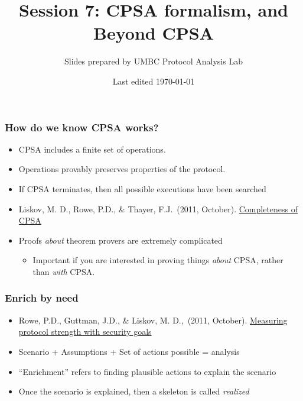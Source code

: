 \documentclass[red]{beamer}
\begin{document}

\title{Session 7: CPSA formalism, and Beyond CPSA}
\author{Slides prepared by UMBC Protocol Analysis Lab}
\date{Last edited \today}
\begin{frame}
\maketitle
\end{frame}

\begin{frame}\frametitle{How do we know CPSA works?}

\begin{itemize}
\pause
\item CPSA includes a finite set of operations.
\pause
\item Operations provably preserves properties of the protocol.
\pause
\item If CPSA terminates, then all possible executions have been searched
\pause
\item Liskov, M. D., Rowe, P.D., \& Thayer, F.J.\ (2011, October). \href{https://www.mitre.org/sites/default/files/pdf/12_0038.pdf}{Completeness of CPSA}
\pause
\item Proofs \emph{about} theorem provers are extremely complicated
\begin{itemize}
\pause
\item Important if you are interested in proving things \emph{about} CPSA, rather than \emph{with} CPSA.
\end{itemize}
\end{itemize}
\end{frame}

\begin{frame}\frametitle{Enrich by need}
\begin{itemize}
\pause 
\item Rowe, P.D., Guttman, J.D., \& Liskov, M. D.,\ (2011, October). \href{https://dl.acm.org/doi/abs/10.1007/s10207-016-0319-z}{Measuring protocol strength with security goals}
\pause
\item Scenario + Assumptions + Set of actions possible = analysis
\pause
\item ``Enrichment'' refers to finding plausible actions to explain the scenario
\pause
\item Once the scenario is explained, then a skeleton is called \emph{realized}
\end{itemize}
\end{frame}
\end{document}
